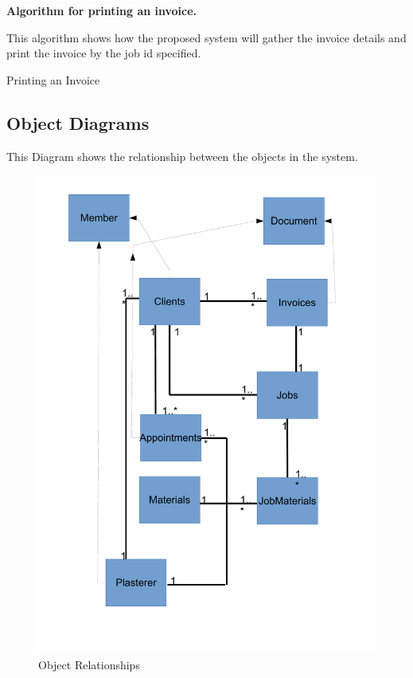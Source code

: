 \pagebreak
\textbf{Algorithm for printing an invoice.}
\begin{flushleft}
This algorithm shows how the proposed system will gather the invoice details and print the invoice by the job id specified.
\end{flushleft}
\begin{algorithm}[H]
\label{fig:printing_an_invoice}
\caption{Printing an Invoice}
\begin{algorithmic}[1]
	\State
	\State
	\Else
	\State
	\EndIf
	\State
	\State
\EndFunction
\end{algorithmic}
\end{algorithm}


\pagebreak
\subsection{Object Diagrams}
\begin{flushleft}
This Diagram shows the relationship between the objects in the system.
\end{flushleft}
\begin{figure}[H]
\includegraphics[scale=0.5]{./Design/images/ObjectDiagram.pdf}
    \caption{Object Relationships} 
\label{fig:ObjectDiagram}
\end{figure}



